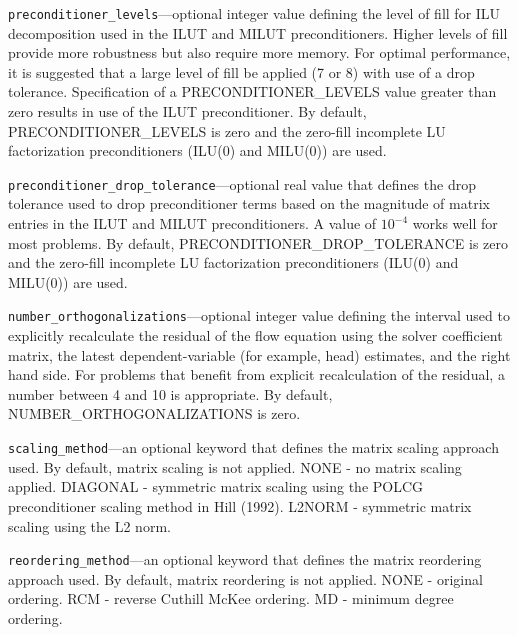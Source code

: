\begin{description}
\item \texttt{preconditioner\_levels}---optional integer value defining the level of fill for ILU decomposition used in the ILUT and MILUT preconditioners. Higher levels of fill provide more robustness but also require more memory. For optimal performance, it is suggested that a large level of fill be applied (7 or 8) with use of a drop tolerance. Specification of a PRECONDITIONER\_LEVELS value greater than zero results in use of the ILUT preconditioner. By default, PRECONDITIONER\_LEVELS is zero and the zero-fill incomplete LU factorization preconditioners (ILU(0) and MILU(0)) are used.

\item \texttt{preconditioner\_drop\_tolerance}---optional real value that defines the drop tolerance used to drop preconditioner terms based on the magnitude of matrix entries in the ILUT and MILUT preconditioners. A value of $10^{-4}$ works well for most problems. By default, PRECONDITIONER\_DROP\_TOLERANCE is zero and the zero-fill incomplete LU factorization preconditioners (ILU(0) and MILU(0)) are used.

\item \texttt{number\_orthogonalizations}---optional integer value defining the interval used to explicitly recalculate the residual of the flow equation using the solver coefficient matrix, the latest dependent-variable (for example, head) estimates, and the right hand side. For problems that benefit from explicit recalculation of the residual, a number between 4 and 10 is appropriate. By default, NUMBER\_ORTHOGONALIZATIONS is zero.

\item \texttt{scaling\_method}---an optional keyword that defines the matrix scaling approach used. By default, matrix scaling is not applied.  NONE - no matrix scaling applied.  DIAGONAL - symmetric matrix scaling using the POLCG preconditioner scaling method in Hill (1992).  L2NORM - symmetric matrix scaling using the L2 norm.

\item \texttt{reordering\_method}---an optional keyword that defines the matrix reordering approach used. By default, matrix reordering is not applied.  NONE - original ordering.  RCM - reverse Cuthill McKee ordering.  MD - minimum degree ordering.

\end{description}

